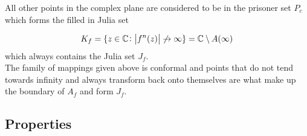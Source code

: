 \documentclass[12pt]{article}
\begin{document}
{All other points in the complex plane are considered to be in the prisoner set $P_c$ \cite{goodwin} which forms the filled in Julia set \cite{Fassett}

\begin{align*}
K_f =  \{ z \in \mathbb{C} \colon \abs{ f^{n}(z)} \not\rightarrow \infty \} = \mathbb{C}  \setminus A(\infty)
\end{align*}
which always contains the Julia set $J_f$. \\

The family of mappings given above is conformal and points that do not tend towards infinity and always transform back onto themselves are what make up the boundary of $A_f$ and form $J_f$.\cite{hypertext} \\

}
\subsection{Properties}
\end{document}
